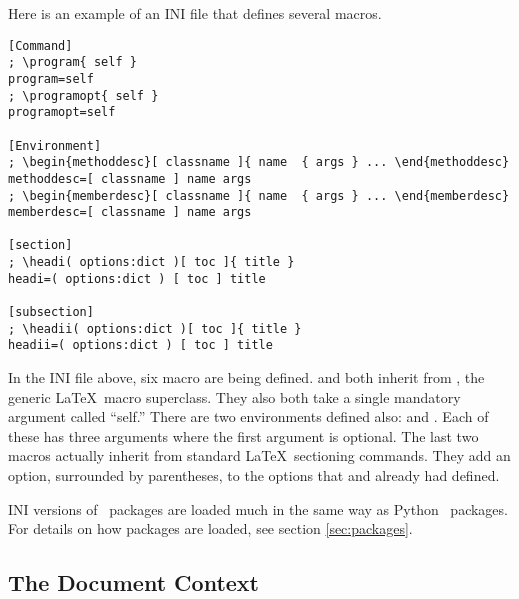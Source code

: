 Here is an example of an INI file that defines several macros.
\begin{verbatim}
[Command]
; \program{ self }
program=self
; \programopt{ self }
programopt=self

[Environment]
; \begin{methoddesc}[ classname ]{ name  { args } ... \end{methoddesc}
methoddesc=[ classname ] name args
; \begin{memberdesc}[ classname ]{ name  { args } ... \end{memberdesc}
memberdesc=[ classname ] name args

[section]
; \headi( options:dict )[ toc ]{ title }
headi=( options:dict ) [ toc ] title

[subsection]
; \headii( options:dict )[ toc ]{ title }
headii=( options:dict ) [ toc ] title
\end{verbatim}

In the INI file above, six macro are being defined.   and
 both inherit from , the generic 
\LaTeX\ macro superclass.  They also both take a single mandatory argument
called ``self.''  There are two environments defined also: 
 and .  Each of these
has three arguments where the first argument is optional.  The 
last two macros actually inherit from standard \LaTeX\ sectioning commands.
They add an option, surrounded by parentheses, to the options that
 and  already had defined.

INI versions of \plasTeX\ packages are loaded much in the same way as
Python \plasTeX\ packages.  For details on how packages are loaded, see
section \ref{sec:packages}.


\subsection{The Document Context\label{sec:contextmacros}}

